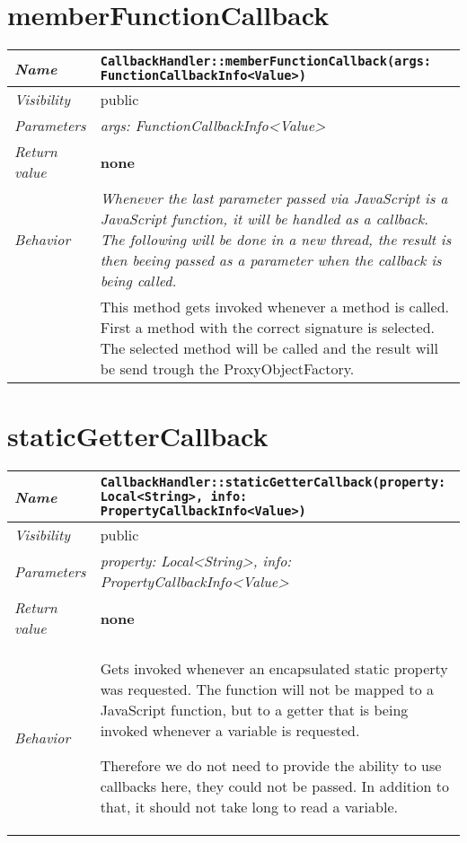  \section{memberFunctionCallback}
\begin{longtable}{p{3cm} @{\hskip 1cm} p{12cm}}
 \hline
\textit{Name} & \texttt{CallbackHandler::memberFunctionCallback(args: FunctionCallbackInfo<Value>)}\\
\hline
 \textit{Visibility} & public\\
\hline
\textit{Parameters} & \textit{args: FunctionCallbackInfo<Value>}\\
\hline
\textit{Return value} & \textbf{none}\\
  \hline
 \textit{Behavior} & \textit{Whenever the last parameter passed via JavaScript is a JavaScript function, it will be handled as a callback. The following will be done in a new thread, the result is then beeing passed as a parameter when the callback is being called.}\\

 & This method gets invoked whenever a method is called. First a method with the correct signature is selected.
 The selected method will be called and the result will be send trough the ProxyObjectFactory. \\
\hline
\end{longtable} \pagebreak
 \section{staticGetterCallback}
\begin{longtable}{p{3cm} @{\hskip 1cm} p{12cm}}
 \hline
\textit{Name} & \texttt{CallbackHandler::staticGetterCallback(property: Local<String>, info: PropertyCallbackInfo<Value>)}\\
\hline
 \textit{Visibility} & public\\
\hline
\textit{Parameters} & \textit{property: Local<String>, info: PropertyCallbackInfo<Value>}\\
\hline
\textit{Return value} & \textbf{none}\\
  \hline
 \textit{Behavior} &  Gets invoked whenever an encapsulated static property was requested. The function will not be mapped to a JavaScript function, but to a getter that is being invoked whenever a variable is requested.

 Therefore we do not need to provide the ability to use callbacks here, they could not be passed. In addition to that, it should not take long to read a variable. \\
\hline
\end{longtable}
